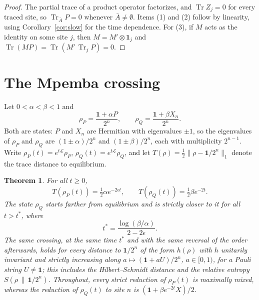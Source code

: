 \documentclass[11pt,a4paper]{article}
\newtheorem{theorem}{Theorem}
\theoremstyle{definition}
\theoremstyle{plain}
\DeclareMathOperator{\Tr}{Tr}
\newcommand{\norm}[1]{\lVert#1\rVert}
\newcommand{\one}{\mathbf{1}}
\newcommand{\cL}{\mathcal{L}}
\begin{document}
\begin{proof}
The partial trace of a product operator factorizes, and $\Tr Z_j=0$ for
every traced site, so $\Tr_{\bar A}P=0$ whenever $\bar A\ne\emptyset$. Items
(1) and (2) follow by linearity, using Corollary~\ref{cor:slow} for the time
dependence. For (3), if $M$ acts as the identity on some site $j$, then
$M=M'\otimes\one_j$ and $\Tr(MP)=\Tr(M'\,\Tr_j P)=0$.
\end{proof}

\section{The Mpemba crossing}\label{sec:crossing}
Let $0<\alpha<\beta<1$ and
\[
\rho_P=\frac{\one+\alpha P}{2^n},\qquad
\rho_Q=\frac{\one+\beta X_n}{2^n}.
\]
Both are states: $P$ and $X_n$ are Hermitian with eigenvalues $\pm1$, so the
eigenvalues of $\rho_P$ and $\rho_Q$ are $(1\pm\alpha)/2^n$ and
$(1\pm\beta)/2^n$, each with multiplicity $2^{n-1}$. Write
$\rho_P(t)=e^{t\cL}\rho_P$, $\rho_Q(t)=e^{t\cL}\rho_Q$, and let
$T(\rho)=\frac12\norm{\rho-\one/2^n}_1$ denote the trace distance to
equilibrium.

\begin{theorem}\label{thm:crossing}
For all $t\ge0$,
\[
T(\rho_P(t))=\tfrac12\alpha e^{-2\epsilon t},\qquad
T(\rho_Q(t))=\tfrac12\beta e^{-2t}.
\]
The state $\rho_Q$ starts farther from equilibrium and is strictly closer
to it for all $t>t^*$, where
\[
t^*=\frac{\log(\beta/\alpha)}{2-2\epsilon}.
\]
The same crossing, at the same time $t^*$ and with the same reversal of the
order afterwards, holds for every distance to $\one/2^n$ of the form
$h(\rho)$ with $h$ unitarily invariant and strictly increasing along
$a\mapsto(\one+aU)/2^n$, $a\in[0,1)$, for a Pauli string $U\ne\one$; this
includes the Hilbert--Schmidt distance and the relative entropy
$S(\rho\,\|\,\one/2^n)$. Throughout, every strict reduction of
$\rho_P(t)$ is maximally mixed, whereas the reduction of $\rho_Q(t)$ to
site $n$ is $(\one+\beta e^{-2t}X)/2$.
\end{theorem}
\end{document}
